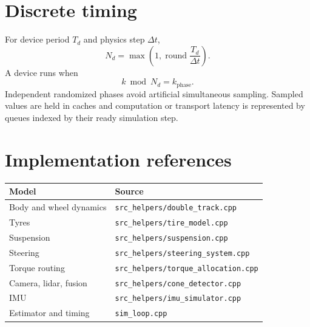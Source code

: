 \documentclass[11pt,a4paper]{article}
\begin{document}
\section{Discrete timing}

For device period \(T_d\) and physics step \(\Delta t\),
\begin{equation}
  N_d=\max\left(1,\operatorname{round}\frac{T_d}{\Delta t}\right).
\end{equation}
A device runs when
\begin{equation}
  k\bmod N_d=k_{\mathrm{phase}}.
\end{equation}
Independent randomized phases avoid artificial simultaneous sampling.
Sampled values are held in caches and computation or transport latency is
represented by queues indexed by their ready simulation step.

\section{Implementation references}

\begin{center}
\begin{tabular}{ll}
\toprule
Model & Source\\
\midrule
Body and wheel dynamics & \texttt{src\_helpers/double\_track.cpp}\\
Tyres & \texttt{src\_helpers/tire\_model.cpp}\\
Suspension & \texttt{src\_helpers/suspension.cpp}\\
Steering & \texttt{src\_helpers/steering\_system.cpp}\\
Torque routing & \texttt{src\_helpers/torque\_allocation.cpp}\\
Camera, lidar, fusion & \texttt{src\_helpers/cone\_detector.cpp}\\
IMU & \texttt{src\_helpers/imu\_simulator.cpp}\\
Estimator and timing & \texttt{sim\_loop.cpp}\\
\bottomrule
\end{tabular}
\end{center}
\end{document}
